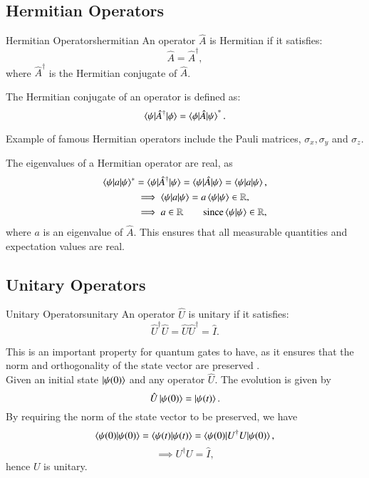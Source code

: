 \subsection{Hermitian Operators}
\label{sub:hermitian}

\begin{definition}{Hermitian Operators}{hermitian}
An operator $ \hat A $ is Hermitian if it satisfies:
\begin{equation}
	\hat A = \hat A^\dagger,
\end{equation}
where $ \hat A^\dagger $ is the Hermitian conjugate of $ \hat A $. 

The Hermitian conjugate of an operator is defined as:
\begin{equation}
	\braket{\psi|\hat A^{\dagger} |\phi} = \braket{\phi|\hat A|\psi}^*.
\end{equation}

\end{definition}
Example of famous Hermitian operators include the Pauli matrices, $\sigma_x, \sigma_y$ and $\sigma_z$.


The eigenvalues of a Hermitian operator are real, as 
\begin{equation}
\begin{aligned}
	\braket{\psi|a|\psi}^* &= \braket{\psi|\hat A^{\dagger}|\psi} = \braket{\psi|\hat A|\psi} = \braket{\psi|a|\psi}, \\
					&\implies \braket{\psi|a|\psi} = a \braket{\psi|\psi}  \in \mathbb{R}, \\
					&\implies a \in \mathbb{R} \quad \quad \text{since} \braket{\psi|\psi} \in \mathbb{R},
\end{aligned}
\end{equation}
where $ a $ is an eigenvalue of $ \hat A $.
This ensures that all measurable quantities and expectation values are real.

\subsection{Unitary Operators}
\label{sub:unitary}
\begin{definition}{Unitary Operators}{unitary}
	An operator $ \hat U $ is unitary if it satisfies:
	\begin{equation}
		\hat U^\dagger \hat U = \hat U \hat U^\dagger = \hat I.
	\end{equation}
\end{definition}


This is an important property for quantum gates to have, as it ensures that the norm and orthogonality of the state vector are preserved . \\
Given an initial state $ \ket{\psi(0)} $ and any operator $ \hat U $. The evolution is given by
\[ \hat U \ket{\psi(0)} = \ket{\psi(t)}.  \]
By requiring the norm of the state vector to be preserved, we have
\[ \braket{\psi(0)|\psi(0)} = \braket{\psi(t)|\psi(t)} = \braket{\psi(0)|U^{\dagger}U|\psi(0)}, \] 
\[ \implies U^{\dagger}U = \hat I, \] 
hence $ U $ is unitary.

